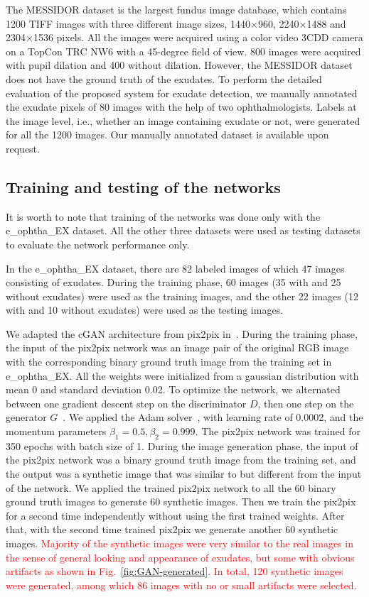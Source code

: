 \documentclass{osa-article}
\begin{document}
The MESSIDOR dataset is the largest fundus image database, which contains 1200 TIFF images with three different image sizes, 1440$\times$960, 2240$\times$1488 and 2304$\times$1536 pixels. All the images were acquired using a color video 3CDD camera on a TopCon TRC NW6 with a 45-degree field of view. 800 images were acquired with pupil dilation and 400 without dilation. However, the MESSIDOR dataset does not have the ground truth of the exudates. To perform the detailed evaluation of the proposed system for exudate detection, we manually annotated the exudate pixels of 80 images with the help of two ophthalmologists.  Labels at the image level, i.e., whether an image containing exudate or not, were generated for all the 1200 images. Our manually annotated dataset is available upon request.


\subsection{Training and testing of the networks}
It is worth to note that training of the networks was done only with the e\_ophtha\_EX dataset. All the other three datasets were used as testing datasets to evaluate the network performance only.

In the e\_ophtha\_EX dataset, there are 82 labeled images of which 47 images consisting of exudates. During the training phase, 60 images (35 with and 25 without exudates) were used as the training images, and the other 22 images (12 with and 10 without exudates) were used as the testing images. 


We adapted the cGAN architecture from pix2pix in~\cite{isola2016image}. During the training phase, the input of the pix2pix network was an image pair of the original RGB image with the corresponding binary ground truth image from the training set in e\_ophtha\_EX. All the weights were initialized from a gaussian distribution with mean 0 and standard deviation 0.02. To optimize the network, we alternated between one gradient descent step on the discriminator $D$, then one step on the generator $G$~\cite{isola2016image}. We applied the Adam solver~\cite{kinga2015method}, with learning rate of 0.0002, and the momentum parameters $\beta_1=0.5, \beta_2=0.999$.  The pix2pix network was trained for 350 epochs with batch size of 1. During the image generation phase, the input of the pix2pix network was a binary ground truth image from the training set, and the output was a synthetic image that was similar to but different from the input of the network. We applied the trained pix2pix network to all the 60 binary ground truth images to generate 60 synthetic images. Then we train the pix2pix for a second time independently without using the first trained weights. After that, with the second time trained pix2pix we generate another 60 synthetic images. \textcolor{red}{ Majority of the synthetic images were very similar to the real images in the sense of general looking and appearance of exudates, but some with obvious artifacts as shown in Fig.~\ref{fig:GAN-generated}. In total, 120 synthetic images were generated, among which 86 images with no or small artifacts were selected.  } 
\end{document}

